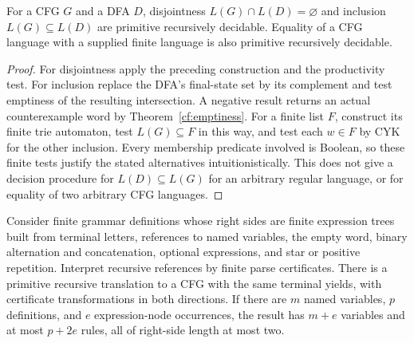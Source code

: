 \begin{corollary}
\label{cf:regular-decisions}
For a CFG $G$ and a DFA $D$, disjointness
$L(G)\cap L(D)=\varnothing$ and inclusion $L(G)\subseteq L(D)$ are primitive
recursively decidable.  Equality of a CFG language with a supplied finite
language is also primitive recursively decidable.
\end{corollary}

\begin{proof}
For disjointness apply the preceding construction and the productivity
test.  For inclusion replace the DFA's final-state set by its complement
and test emptiness of the resulting intersection.  A negative result
returns an actual counterexample word by Theorem~\ref{cf:emptiness}.
For a finite list $F$, construct its finite trie automaton, test
$L(G)\subseteq F$ in this way, and test each $w\in F$ by CYK for the other
inclusion.  Every membership predicate involved is Boolean, so these
finite tests justify the stated alternatives intuitionistically.  This
does not give a decision procedure for $L(D)\subseteq L(G)$ for an arbitrary
regular language, or for equality of two arbitrary CFG languages.
\end{proof}

\begin{theorem}
\label{cf:ebnf}
Consider finite grammar definitions whose right sides are finite expression
trees built from terminal letters, references to named variables, the empty
word, binary alternation and concatenation, optional expressions, and
star or positive repetition.  Interpret recursive references by finite
parse certificates.  There is a primitive recursive translation to a CFG
with the same terminal yields, with certificate transformations in both
directions.  If there are $m$ named variables, $p$ definitions, and $e$
expression-node occurrences, the result has $m+e$ variables and at most
$p+2e$ rules, all of right-side length at most two.
\end{theorem}


